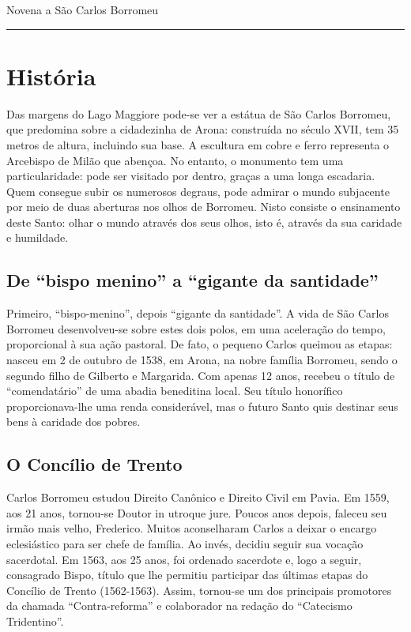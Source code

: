 \documentclass[a4paper,14pt]{extarticle} \usepackage[utf8]{inputenc}
\begin{document}

\begin{center}
  {\huge Novena a São Carlos Borromeu}
\end{center}

\par\noindent\rule{\textwidth}{0.4pt}

\tableofcontents
\thispagestyle{empty}

\newpage

\section{História}
Das margens do Lago Maggiore pode-se ver a estátua de São Carlos Borromeu, que predomina sobre a cidadezinha de Arona: construída no século XVII, tem 35 metros de altura, incluindo sua base. A escultura em cobre e ferro representa o Arcebispo de Milão que abençoa. No entanto, o monumento tem uma particularidade: pode ser visitado por dentro, graças a uma longa escadaria. Quem consegue subir os numerosos degraus, pode admirar o mundo subjacente por meio de duas aberturas nos olhos de Borromeu. Nisto consiste o ensinamento deste Santo: olhar o mundo através dos seus olhos, isto é, através da sua caridade e humildade.
\subsection{De ``bispo menino'' a ``gigante da santidade''}
Primeiro, ``bispo-menino'', depois ``gigante da santidade''. A vida de São Carlos Borromeu desenvolveu-se sobre estes dois polos, em uma aceleração do tempo, proporcional à sua ação pastoral.
De fato, o pequeno Carlos queimou as etapas: nasceu em 2 de outubro de 1538, em Arona, na nobre família Borromeu, sendo o segundo filho de Gilberto e Margarida. Com apenas 12 anos, recebeu o título de ``comendatário'' de uma abadia beneditina local. Seu título honorífico proporcionava-lhe uma renda considerável, mas o futuro Santo quis destinar seus bens à caridade dos pobres.
\subsection{O Concílio de Trento}
Carlos Borromeu estudou Direito Canônico e Direito Civil em Pavia. Em 1559, aos 21 anos, tornou-se Doutor in utroque jure.
Poucos anos depois, faleceu seu irmão mais velho, Frederico. Muitos aconselharam Carlos a deixar o encargo eclesiástico para ser chefe de família. Ao invés, decidiu seguir sua vocação sacerdotal.
Em 1563, aos 25 anos, foi ordenado sacerdote e, logo a seguir, consagrado Bispo, título que lhe permitiu participar das últimas etapas do Concílio de Trento (1562-1563). Assim, tornou-se um dos principais promotores da chamada ``Contra-reforma'' e colaborador na redação do ``Catecismo Tridentino''.
\end{document}
